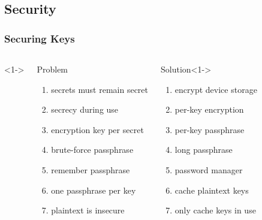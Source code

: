 \documentclass[]{beamer}
\begin{document}
\subsection{Security}
\begin{frame}
  \frametitle{Securing Keys}
  \begin{columns}
    <1->
    \begin{block}{Problem}
      \begin{enumerate}
      \item<2->
        secrets must remain secret
      \item<4->
        secrecy during use
      \item<6->
        encryption key per secret
      \item<8->
        brute-force passphrase
      \item<10->
        remember passphrase
      \item<12->
        one passphrase per key
      \item<14->
        plaintext is insecure
      \end{enumerate}
    \end{block}

    \begin{block}{Solution}<1->
      \begin{enumerate}
      \item<3->
        encrypt device storage
      \item<5->
        per-key encryption
      \item<7->
        per-key passphrase
      \item<9->
        long passphrase
      \item<11->
        password manager
      \item<13->
        cache plaintext keys
      \item<15->
        only cache keys in use
      \end{enumerate}
    \end{block}
  \end{columns}
\end{frame}
\end{document}
